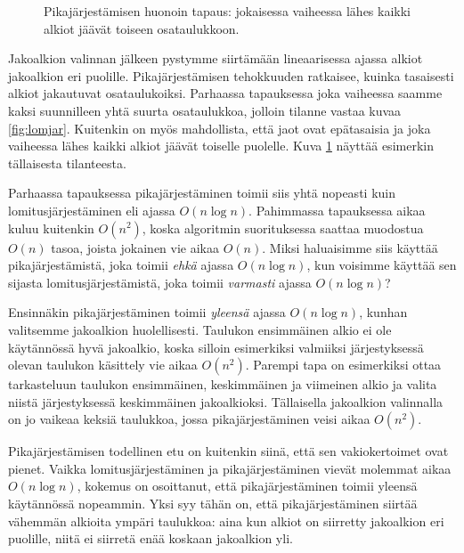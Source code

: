 \begin{figure}
\center
{}
\caption{Pikajärjestämisen huonoin tapaus: jokaisessa vaiheessa lähes kaikki
alkiot jäävät toiseen osataulukkoon.}
\label{fig:pikjar}
\end{figure}

Jakoalkion valinnan jälkeen pystymme siirtämään lineaarisessa ajassa
alkiot jakoalkion eri puolille.
Pikajärjestämisen tehokkuuden ratkaisee, kuinka tasaisesti
alkiot jakautuvat osataulukoiksi.
Parhaassa tapauksessa joka vaiheessa saamme kaksi suunnilleen
yhtä suurta osataulukkoa, jolloin tilanne vastaa kuvaa \ref{fig:lomjar}.
Kuitenkin on myös mahdollista, että jaot ovat epätasaisia ja
joka vaiheessa lähes kaikki alkiot jäävät toiselle puolelle.
Kuva \ref{fig:pikjar} näyttää esimerkin tällaisesta tilanteesta.

Parhaassa tapauksessa pikajärjestäminen toimii siis yhtä nopeasti
kuin lomitusjärjestäminen eli ajassa $O(n \log n)$.
Pahimmassa tapauksessa aikaa kuluu kuitenkin $O(n^2)$,
koska algoritmin suorituksessa saattaa muodostua $O(n)$ tasoa,
joista jokainen vie aikaa $O(n)$.
Miksi haluaisimme siis käyttää pikajärjestämistä,
joka toimii \emph{ehkä} ajassa $O(n \log n)$,
kun voisimme käyttää sen sijasta lomitusjärjestämistä,
joka toimii \emph{varmasti} ajassa $O(n \log n)$?

Ensinnäkin pikajärjestäminen toimii \emph{yleensä}
ajassa $O(n \log n)$, kunhan valitsemme jakoalkion huolellisesti.
Taulukon ensimmäinen alkio ei ole käytän\-nössä hyvä jakoalkio,
koska silloin esimerkiksi valmiiksi järjestyksessä olevan
taulukon käsittely vie aikaa $O(n^2)$.
Parempi tapa on esimerkiksi ottaa tarkasteluun taulukon ensimmäinen,
keskimmäinen ja viimeinen alkio ja valita niistä
järjestyksessä keskimmäinen jakoalkioksi.
Tällaisella jakoalkion valinnalla on jo vaikeaa keksiä taulukkoa,
jossa pikajärjestäminen veisi aikaa $O(n^2)$.

Pikajärjestämisen todellinen etu on kuitenkin siinä,
että sen vakiokertoimet ovat pienet.
Vaikka lomitusjärjestäminen ja pikajärjestäminen vievät molemmat
aikaa $O(n \log n)$, kokemus on osoittanut, että
pikajärjestäminen toimii yleensä käytännössä nopeammin.
Yksi syy tähän on, että pikajärjestä\-minen siirtää vähemmän
alkioita ympäri taulukkoa: aina kun alkiot on siirretty
jakoalkion eri puolille, niitä ei siirretä enää koskaan
jakoalkion yli.

